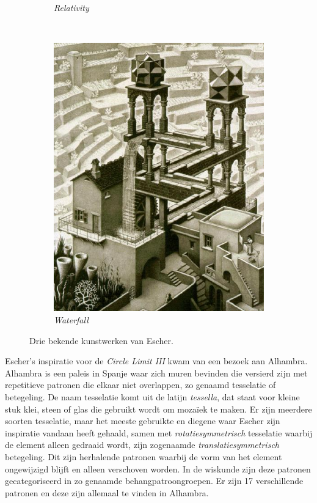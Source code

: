 \documentclass{article}
\begin{document}
\begin{figure}[h]
\begin{subfigure}{0.33\textwidth}
                \caption{\textit{Relativity}}
        \end{subfigure}%
        ~ 
        \begin{subfigure}{0.33\textwidth}
                \includegraphics[width=\textwidth]{Escher_Waterfall}
                \caption{\textit{Waterfall}}
        \end{subfigure}%
        \caption{Drie bekende kunstwerken van Escher.}
        \label{fig:structCompare}
\end{figure}

\noindent Escher's inspiratie voor de \textit{Circle Limit III} kwam van een bezoek aan Alhambra. Alhambra is een paleis in Spanje waar zich muren bevinden die versierd zijn met repetitieve patronen die elkaar niet overlappen, zo genaamd tesselatie of betegeling. De naam tesselatie komt uit de latijn \textit{tessella}, dat staat voor kleine stuk klei, steen of glas die gebruikt wordt om moza\"iek te maken. Er zijn meerdere soorten tesselatie, maar het meeste gebruikte en diegene waar Escher zijn inspiratie vandaan heeft gehaald, samen met \textit{rotatiesymmetrisch} tesselatie waarbij de element alleen gedraaid wordt, zijn zogenaamde \textit{translatiesymmetrisch} betegeling. Dit zijn herhalende patronen waarbij de vorm van het element ongewijzigd blijft en alleen verschoven worden. In de wiskunde zijn deze patronen gecategoriseerd in zo genaamde behangpatroongroepen. Er zijn 17 verschillende patronen en deze zijn allemaal te vinden in Alhambra. 
\end{document}
